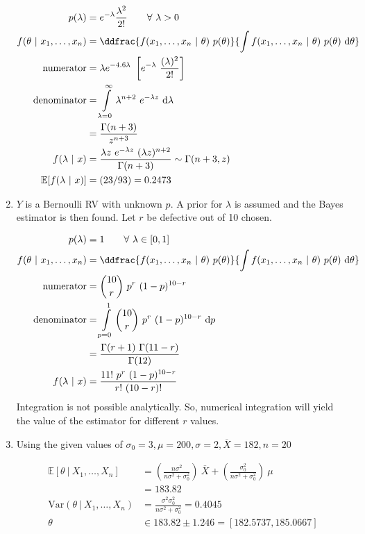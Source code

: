 \begin{enumerate}
		\begin{align}
			p(\lambda) &= e^{-\lambda} \frac{\lambda^2}{2!}\qquad \forall\ \lambda > 0 \nonumber \\
			f(\theta\ |\ x_1, \dots, x_n) &= \ddfrac{f(x_1, \dots, x_n\ |\ \theta)\ p(\theta)}{\int\limits f(x_1, \dots, x_n\ |\ \theta)\ p(\theta)\  \mathrm{d}\theta} \\
			\text{numerator}&= \lambda e^{-4.6\lambda }\ \left[e^{-\lambda}\ \dfrac{(\lambda)^{2}}{2!}\right] \nonumber \\
			\text{denominator}&= \int\limits_{\lambda=0}^{\infty} \lambda^{n+2}\ e^{-\lambda z}\ \mathrm{d}\lambda \nonumber \\
			&= \frac{\Gamma(n+3)}{z^{n+3}}\nonumber \\
			f(\lambda\ |\ x) &= \frac{\lambda z\ e^{-\lambda z}\ (\lambda z)^{n+2}}{\Gamma(n+3)} \sim \Gamma(n+3, z) \\
			\mathbb{E}[f(\lambda\ |\ x)] &= (23/93) = 0.2473
		\end{align}
	
	
	\item $ Y $ is a Bernoulli RV with unknown $ p $. A prior for $ \lambda $ is assumed and the Bayes estimator is then found. Let $ r $ be defective out of 10 chosen.
	
		\begin{align}
			p(\lambda) &= 1\qquad \forall\ \lambda \in [0, 1] \nonumber \\
			f(\theta\ |\ x_1, \dots, x_n) &= \ddfrac{f(x_1, \dots, x_n\ |\ \theta)\ p(\theta)}{\int\limits f(x_1, \dots, x_n\ |\ \theta)\ p(\theta)\  \mathrm{d}\theta} \\
			\text{numerator}&= \binom{10}{r}\ p^r\ (1-p)^{10-r} \nonumber \\
			\text{denominator}&= \int\limits_{p=0}^{1} \binom{10}{r}\ p^r\ (1-p)^{10-r}\ \mathrm{d}p \nonumber \\
			&= \frac{\Gamma(r+1)\ \Gamma(11-r)}{\Gamma(12)}\nonumber \\
			f(\lambda\ |\ x) &= \frac{11!\ p^r\ (1-p)^{10-r}}{r!\ (10-r)!}
		\end{align}
		Integration is not possible analytically. So, numerical integration will yield the value of the estimator for different $ r $ values.
	
	
	\item Using the given values of $ \sigma_0 = 3, \mu = 200, \sigma = 2, \overline{X} = 182, n = 20 $
	
		\begin{align}
			\mathbb{E}[\theta\ |\ X_1, \dots, X_n] &= \left(\frac{n\sigma^2}{n\sigma^2 + \sigma_0^2}\right)\ \overline{X} + \left(\frac{\sigma_0^2}{n\sigma^2 + \sigma_0^2}\right)\ \mu \nonumber \\
			&= 183.82 \nonumber \\
			\mathrm{Var}(\theta\ |\ X_1, \dots, X_n) &= \frac{\sigma^2 \sigma_0^2}{n\sigma^2 + \sigma_0^2} = 0.4045 \nonumber \\
			\theta &\in 183.82 \pm 1.246 = [182.5737, 185.0667]
		\end{align}
	
	
	
	
\end{enumerate}
